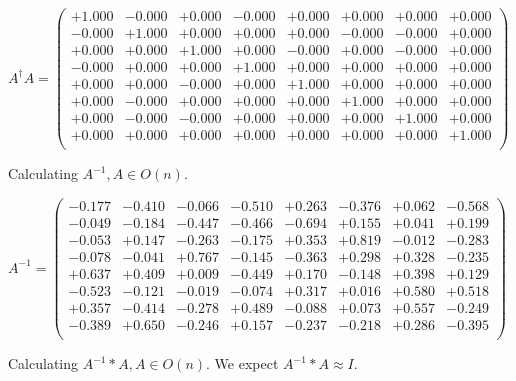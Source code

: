 \documentclass[9pt]{article}
\theoremstyle{plain}
\theoremstyle{definition}
\theoremstyle{remark}
\numberwithin{equation}{section}
\begin{document}
$A^{\dag} A = \left(
\begin{array}{
cccccccc}
+1.000 & -0.000 & +0.000 & -0.000 & +0.000 & +0.000 & +0.000 & +0.000 \\
-0.000 & +1.000 & +0.000 & +0.000 & +0.000 & -0.000 & -0.000 & +0.000 \\
+0.000 & +0.000 & +1.000 & +0.000 & -0.000 & +0.000 & -0.000 & +0.000 \\
-0.000 & +0.000 & +0.000 & +1.000 & +0.000 & +0.000 & +0.000 & +0.000 \\
+0.000 & +0.000 & -0.000 & +0.000 & +1.000 & +0.000 & +0.000 & +0.000 \\
+0.000 & -0.000 & +0.000 & +0.000 & +0.000 & +1.000 & +0.000 & +0.000 \\
+0.000 & -0.000 & -0.000 & +0.000 & +0.000 & +0.000 & +1.000 & +0.000 \\
+0.000 & +0.000 & +0.000 & +0.000 & +0.000 & +0.000 & +0.000 & +1.000 \\
\end{array}
\right)$ \newline 

Calculating $A^{-1} ,  A \in O(n)$.

$A^{-1} = \left(
\begin{array}{
cccccccc}
-0.177 & -0.410 & -0.066 & -0.510 & +0.263 & -0.376 & +0.062 & -0.568 \\
-0.049 & -0.184 & -0.447 & -0.466 & -0.694 & +0.155 & +0.041 & +0.199 \\
-0.053 & +0.147 & -0.263 & -0.175 & +0.353 & +0.819 & -0.012 & -0.283 \\
-0.078 & -0.041 & +0.767 & -0.145 & -0.363 & +0.298 & +0.328 & -0.235 \\
+0.637 & +0.409 & +0.009 & -0.449 & +0.170 & -0.148 & +0.398 & +0.129 \\
-0.523 & -0.121 & -0.019 & -0.074 & +0.317 & +0.016 & +0.580 & +0.518 \\
+0.357 & -0.414 & -0.278 & +0.489 & -0.088 & +0.073 & +0.557 & -0.249 \\
-0.389 & +0.650 & -0.246 & +0.157 & -0.237 & -0.218 & +0.286 & -0.395 \\
\end{array}
\right)$ \newline 

Calculating $A^{-1} *A  ,  A \in O(n)$.   We expect $A^{-1} *A  \approx I$. 
\end{document}
